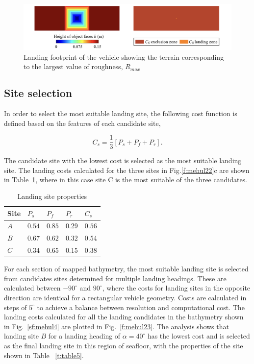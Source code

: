 \begin{figure}[!ht]
\centering
\includegraphics[width=6.5in]{./images/mehul22a.png}
\caption{Landing footprint of the vehicle showing the terrain corresponding to the largest value of roughness, $R_{max}$}
\label{f:mehul22a}
\end{figure}
 
\subsection{Site selection}
 
In order to select the most suitable landing site, the following cost function is defined based on the features of each candidate site,
 
 \begin{equation}
 \label{eq:eq13}
	C_s = \frac{1}{3}\left[P_s + P_f + P_r \right].
\end{equation} 

\noindent The candidate site with the lowest cost is selected as the most suitable landing site. The landing costs calculated for the three sites in Fig.\ref{f:mehul22}c are shown in Table~\ref{t:table4}, where in this case site C is the most suitable of the three candidates. 
   			
\begin{table}[!ht]
\centering
\caption{Landing site properties}
\begin{tabular}{  |p{2cm} p{2cm} p{2cm} p{2cm} p{2cm}| }
\hline
\textbf{Site} & \textbf{$P_s$} & \textbf{$P_f$} & \textbf{$P_r$} & \textbf{$C_s$}\\ \hline 
$A$ & $0.54$ & $0.85$ & $0.29$ & $0.56$ \\
$B$ & $0.67$ & $0.62$ & $0.32$ & $0.54$ \\
$C$ & $0.34$ & $0.65$ & $0.15$ & $0.38$ \\
\hline
\end{tabular}
\label{t:table4}
\end{table}

For each section of mapped bathymetry, the most suitable landing site is selected from candidates sites determined for multiple landing headings. These are calculated between $-90^\circ$ and $90^\circ$, where the costs for landing sites in the opposite direction are identical for a rectangular vehicle geometry. Costs are calculated in steps of $5^\circ$ to achieve a balance between resolution and computational cost. The landing costs calculated for all the landing candidates in the bathymetry shown in Fig.~\ref{sf:mehul4} are plotted in Fig.~\ref{f:mehul23}. The analysis shows that landing site $B$ for a landing heading of  $\alpha = 40^\circ$ has the lowest cost and is selected as the final landing site in this region of seafloor, with the properties of the site shown in Table ~\ref{t:table5}.


